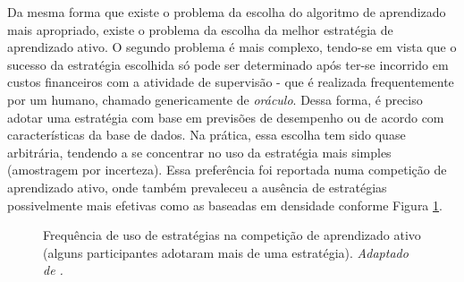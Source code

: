 Da mesma forma que existe o problema da escolha do algoritmo de aprendizado
mais apropriado, existe o problema da escolha da melhor estratégia de
aprendizado ativo.
O segundo problema é mais complexo, tendo-se em vista que o sucesso
da estratégia escolhida só pode ser determinado após ter-se incorrido
em custos financeiros com a atividade de supervisão - que é realizada
frequentemente por um humano, chamado genericamente de \textit{oráculo}.
% 
Dessa forma, é preciso adotar uma estratégia
com base em previsões de desempenho ou de acordo com características da base
de dados.
Na prática, essa escolha tem sido quase arbitrária, tendendo a se concentrar
no uso da estratégia mais simples (amostragem por incerteza).
Essa preferência foi reportada numa competição de aprendizado ativo,
onde também prevaleceu a ausência de estratégias possivelmente mais efetivas
como as baseadas em densidade conforme
Figura \ref{compet}.
\begin{figure}
\caption{Frequência de uso de estratégias na competição de aprendizado ativo
(alguns participantes adotaram mais de uma estratégia).
\textit{Adaptado de \citep{journals/jmlr/GuyonCDL11}.}}
\label{compet}
\begin{center}
\end{center}
\end{figure}

